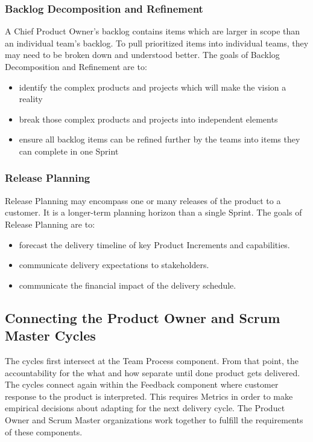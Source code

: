 \documentclass[12pt,a4paper,parskip=full]{scrartcl}
\begin{document}
\subsubsection{Backlog Decomposition and
Refinement}\label{backlog-decomposition-and-refinement}

A Chief Product Owner's backlog contains items which are larger in scope
than an individual team's backlog. To pull prioritized items into
individual teams, they may need to be broken down and understood better.
The goals of Backlog Decomposition and Refinement are to:

\begin{itemize}
\itemsep1pt\parskip0pt
\item
  identify the complex products and projects which will make the vision
  a reality
\item
  break those complex products and projects into independent elements
\item
  ensure all backlog items can be refined further by the teams into
  items they can complete in one Sprint
\end{itemize}

\subsubsection{Release Planning}\label{Release-planning}

Release Planning may encompass one or many releases of the product to a
customer. It is a longer-term planning horizon than a single Sprint. The
goals of Release Planning are to:

\begin{itemize}
\itemsep1pt\parskip0pt
\item
  forecast the delivery timeline of key Product Increments and
  capabilities.
\item
  communicate delivery expectations to stakeholders.
\item
  communicate the financial impact of the delivery schedule.
\end{itemize}

\subsection{Connecting the Product Owner and Scrum Master
Cycles}\label{Connecting-the-product-owner-and-scrum-master-cycles}

The cycles first intersect at the Team Process component. From that
point, the accountability for the what and how separate until done
product gets delivered. The cycles connect again within the Feedback
component where customer response to the product is interpreted. This
requires Metrics in order to make empirical decisions about adapting for
the next delivery cycle. The Product Owner and Scrum Master
organizations work together to fulfill the requirements of these
components.
\end{document}
